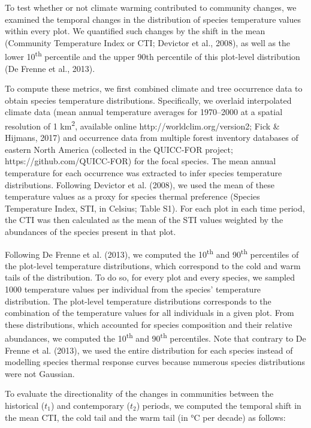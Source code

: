 \documentclass[
  a4paperpaper,
]{article}
\begin{document}
To test whether or not climate warming contributed to community changes,
we examined the temporal changes in the distribution of species
temperature values within every plot. We quantified such changes by the
shift in the mean (Community Temperature Index or CTI; Devictor et al.,
2008), as well as the lower 10\textsuperscript{th} percentile and the
upper 90th percentile of this plot-level distribution (De Frenne et al.,
2013).

To compute these metrics, we first combined climate and tree occurrence
data to obtain species temperature distributions. Specifically, we
overlaid interpolated climate data (mean annual temperature averages for
1970--2000 at a spatial resolution of 1 km\textsuperscript{2}, available
online http://worldclim.org/version2; Fick \& Hijmans, 2017) and
occurrence data from multiple forest inventory databases of eastern
North America (collected in the QUICC-FOR project;
https://github.com/QUICC-FOR) for the focal species. The mean annual
temperature for each occurrence was extracted to infer species
temperature distributions. Following Devictor et al. (2008), we used the
mean of these temperature values as a proxy for species thermal
preference (Species Temperature Index, STI, in Celsius; Table S1). For
each plot in each time period, the CTI was then calculated as the mean
of the STI values weighted by the abundances of the species present in
that plot.

Following De Frenne et al. (2013), we computed the
10\textsuperscript{th} and 90\textsuperscript{th} percentiles of the
plot-level temperature distributions, which correspond to the cold and
warm tails of the distribution. To do so, for every plot and every
species, we sampled 1000 temperature values per individual from the
species' temperature distribution. The plot-level temperature
distributions corresponds to the combination of the temperature values
for all individuals in a given plot. From these distributions, which
accounted for species composition and their relative abundances, we
computed the 10\textsuperscript{th} and 90\textsuperscript{th}
percentiles. Note that contrary to De Frenne et al. (2013), we used the
entire distribution for each species instead of modelling species
thermal response curves because numerous species distributions were not
Gaussian.

To evaluate the directionality of the changes in communities between the
historical (\(t_1\)) and contemporary (\(t_2\)) periods, we computed the
temporal shift in the mean CTI, the cold tail and the warm tail (in °C
per decade) as follows:
\end{document}
